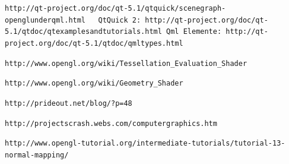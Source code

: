 \documentclass[a4paper,12pt]{article}
\begin{document}
\verb"http://qt-project.org/doc/qt-5.1/qtquick/scenegraph-openglunderqml.html   QtQuick 2: http://qt-project.org/doc/qt-5.1/qtdoc/qtexamplesandtutorials.html Qml Elemente: http://qt-project.org/doc/qt-5.1/qtdoc/qmltypes.html"

 

\verb"http://www.opengl.org/wiki/Tessellation_Evaluation_Shader"

\verb"http://www.opengl.org/wiki/Geometry_Shader"

\verb"http://prideout.net/blog/?p=48"

 

\verb"http://projectscrash.webs.com/computergraphics.htm"

 

\verb"http://www.opengl-tutorial.org/intermediate-tutorials/tutorial-13-normal-mapping/"
\end{document}
